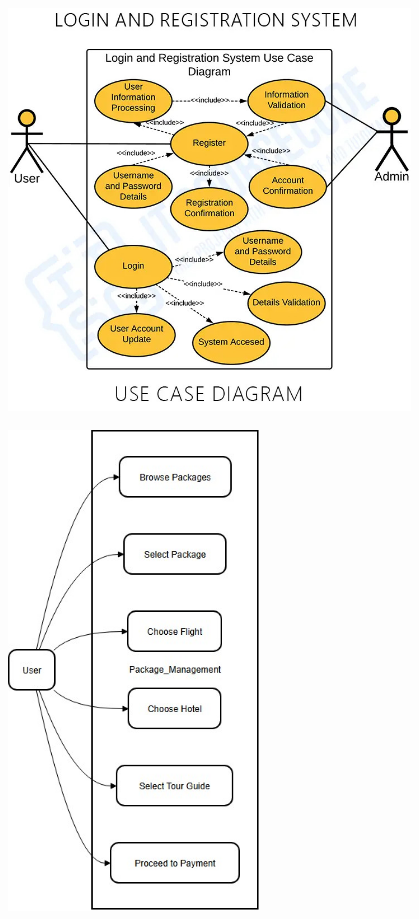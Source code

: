 \vspace{0.5cm}
\begin{center}
\includegraphics[width=0.8\textwidth]{./figures/Use Case Diagrams/1_usecase.jpg} %
\end{center}
\vspace{0.5cm}

\vspace{0.5cm}
\begin{center}
\includegraphics[width=0.5\textwidth]{./figures/Use Case Diagrams/2_usecaase.jpg} %
\end{center}
\vspace{0.5cm}

